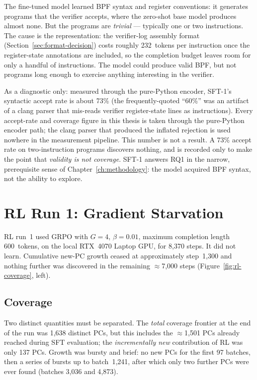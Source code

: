 The fine-tuned model learned BPF syntax and register conventions: it generates
programs that the verifier accepts, where the zero-shot base model produces almost
none. But the programs are \emph{trivial} --- typically one or two instructions.
The cause is the representation: the verifier-log assembly format
(Section~\ref{sec:format-decision}) costs roughly 232~tokens per instruction once
the register-state annotations are included, so the completion budget leaves room
for only a handful of instructions. The model could produce valid BPF, but not
programs long enough to exercise anything interesting in the verifier.

As a diagnostic only: measured through the pure-Python encoder, SFT-1's syntactic
accept rate is about 73\% (the frequently-quoted ``60\%'' was an artifact of a
clang parser that mis-reads verifier register-state lines as instructions). Every
accept-rate and coverage figure in this thesis is taken through the pure-Python
encoder path; the clang parser that produced the inflated rejection is used
nowhere in the measurement pipeline. This number is not a result. A 73\% accept rate on
two-instruction programs discovers nothing, and is recorded only to make the point
that \emph{validity is not coverage}. SFT-1 answers RQ1 in the narrow,
prerequisite sense of Chapter~\ref{ch:methodology}: the model acquired BPF syntax,
not the ability to explore.

\section{RL Run 1: Gradient Starvation}
\label{sec:results-rl}

RL run~1 used GRPO with $G=4$, $\beta=0.01$, maximum
completion length 600~tokens, on the local RTX~4070 Laptop GPU, for 8{,}370 steps.
It did not learn. Cumulative new-PC growth ceased at approximately step~1{,}300 and
nothing further was discovered in the remaining $\approx$7{,}000 steps
(Figure~\ref{fig:rl-coverage}, left).

\subsection{Coverage}
\label{sec:coverage}

Two distinct quantities must be separated. The \emph{total} coverage frontier at
the end of the run was 1{,}638 distinct PCs, but this includes the
$\approx$1{,}501 PCs already reached during SFT evaluation; the \emph{incrementally
new} contribution of RL was only 137 PCs. Growth was bursty and brief: no new PCs for the first 97
batches, then a series of bursts up to batch~1{,}241, after which only two further
PCs were ever found (batches 3{,}036 and 4{,}873).

